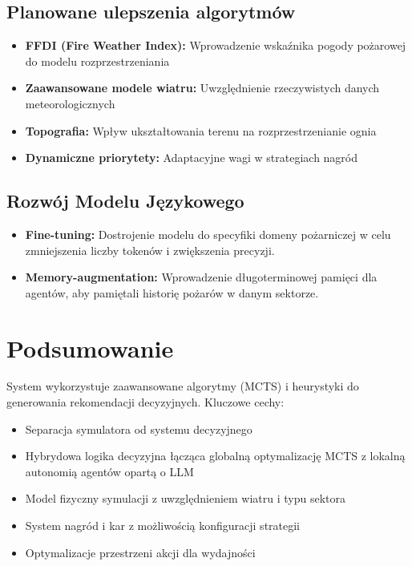 \subsection{Planowane ulepszenia algorytmów}

\begin{itemize}
    \item \textbf{FFDI (Fire Weather Index):} Wprowadzenie wskaźnika pogody pożarowej do modelu rozprzestrzeniania
    \item \textbf{Zaawansowane modele wiatru:} Uwzględnienie rzeczywistych danych meteorologicznych
    \item \textbf{Topografia:} Wpływ ukształtowania terenu na rozprzestrzenianie ognia
    \item \textbf{Dynamiczne priorytety:} Adaptacyjne wagi w strategiach nagród
\end{itemize}

\subsection{Rozwój Modelu Językowego}

\begin{itemize}
    \item \textbf{Fine-tuning:} Dostrojenie modelu do specyfiki domeny pożarniczej w celu zmniejszenia liczby tokenów i zwiększenia precyzji.
    \item \textbf{Memory-augmentation:} Wprowadzenie długoterminowej pamięci dla agentów, aby pamiętali historię pożarów w danym sektorze.
\end{itemize}

\section{Podsumowanie}

System wykorzystuje zaawansowane algorytmy (MCTS) i heurystyki do generowania rekomendacji decyzyjnych. Kluczowe cechy:

\begin{itemize}
    \item Separacja symulatora od systemu decyzyjnego
    \item Hybrydowa logika decyzyjna łącząca globalną optymalizację MCTS z lokalną autonomią agentów opartą o LLM
    \item Model fizyczny symulacji z uwzględnieniem wiatru i typu sektora
    \item System nagród i kar z możliwością konfiguracji strategii
    \item Optymalizacje przestrzeni akcji dla wydajności
\end{itemize}

